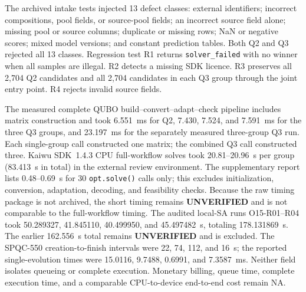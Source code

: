 The archived intake tests injected 13 defect classes: external
identifiers; incorrect compositions, pool fields, or source-pool fields;
an incorrect source field alone; missing pool or source columns; duplicate
or missing rows; NaN or negative scores; mixed model versions; and
constant prediction tables.  Both Q2 and Q3 rejected all 13 classes.
Regression test R1 returns \texttt{solver\_failed} with no winner when all
samples are illegal.  R2 detects a missing SDK licence.  R3 preserves all
2,704 Q2 candidates and all 2,704 candidates in each Q3 group through the
joint entry point.  R4 rejects invalid source fields.

The measured complete QUBO build--convert--adapt--check pipeline
includes matrix construction and took 6.551~ms for Q2, 7.430, 7.524,
and 7.591~ms for the three Q3 groups, and 23.197~ms for the separately
measured three-group Q3 run.  Each single-group call constructed one
matrix; the combined Q3 call constructed three.  Kaiwu SDK~1.4.3 CPU
full-workflow solves took 20.81--20.96~s per group (83.413~s in total)
in the external review environment.  The supplementary report lists
0.48--0.69~s for 30 \texttt{opt.solve()} calls only; this excludes
initialization, conversion, adaptation, decoding, and feasibility checks.
Because the raw timing package is not archived, the short timing remains
\textbf{UNVERIFIED} and is not comparable to the full-workflow timing.  The audited local-SA
runs O15-R01--R04 took 50.289327, 41.845110, 40.499950, and
45.497482~s, totaling 178.131869~s.  The earlier 162.556~s total remains
\textbf{UNVERIFIED} and is excluded.  The SPQC-550 creation-to-finish
intervals were 22, 74, 112, and 16~s; the reported single-evolution times
were 15.0116, 9.7488, 0.6991, and 7.3587~ms.  Neither field isolates
queueing or complete execution.  Monetary billing, queue time, complete
execution time, and a comparable CPU-to-device end-to-end cost remain NA.

